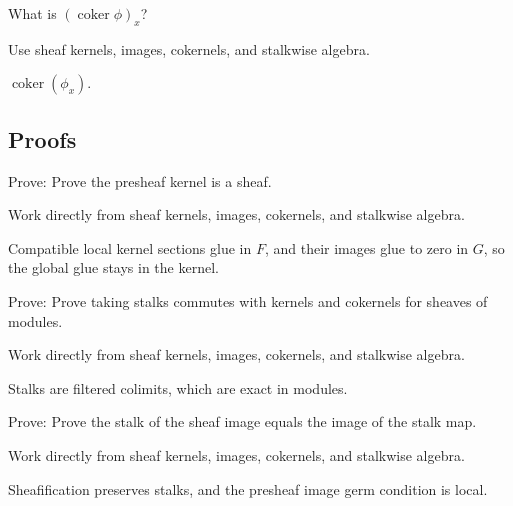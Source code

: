 \begin{exercise}\label{exr:vi15-expand-05}
What is $(\operatorname{coker}\phi)_x$?
\end{exercise}
\begin{hint}
Use sheaf kernels, images, cokernels, and stalkwise algebra.
\end{hint}
\begin{solution}
$\operatorname{coker}(\phi_x)$.
\end{solution}

\subsection*{Proofs}

\begin{exercise}\label{exr:vi15-expand-06}
Prove: Prove the presheaf kernel is a sheaf.
\end{exercise}
\begin{hint}
Work directly from sheaf kernels, images, cokernels, and stalkwise algebra.
\end{hint}
\begin{solution}
Compatible local kernel sections glue in $F$, and their images glue to zero in $G$, so the global glue stays in the kernel.
\end{solution}

\begin{exercise}\label{exr:vi15-expand-07}
Prove: Prove taking stalks commutes with kernels and cokernels for sheaves of modules.
\end{exercise}
\begin{hint}
Work directly from sheaf kernels, images, cokernels, and stalkwise algebra.
\end{hint}
\begin{solution}
Stalks are filtered colimits, which are exact in modules.
\end{solution}

\begin{exercise}\label{exr:vi15-expand-08}
Prove: Prove the stalk of the sheaf image equals the image of the stalk map.
\end{exercise}
\begin{hint}
Work directly from sheaf kernels, images, cokernels, and stalkwise algebra.
\end{hint}
\begin{solution}
Sheafification preserves stalks, and the presheaf image germ condition is local.
\end{solution}


